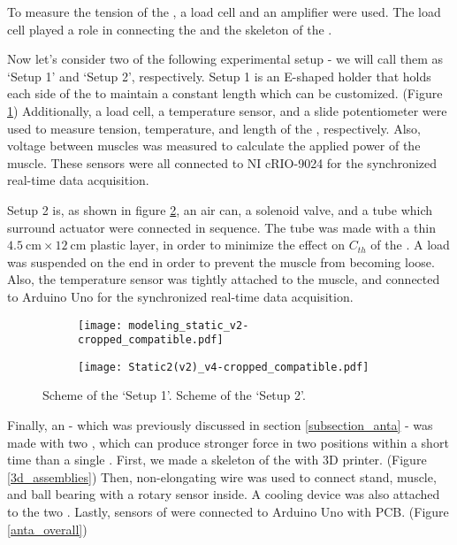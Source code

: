 To measure the tension of the \scpsnospace, a load cell and an amplifier were used.
The load cell played a role in connecting the \scps and the skeleton of the \antanospace.


Now let's consider two of the following experimental setup - we will call them as `Setup 1' and `Setup 2', respectively. Setup 1 is 
%
an E-shaped holder that holds each side of the \scp to maintain a constant length which can be customized. (Figure \ref{static_sch}) Additionally, a load cell, a temperature sensor, and a slide potentiometer were used to measure tension, temperature, and length of the \scpnospace, respectively. Also, voltage between muscles was measured to calculate the applied power of the muscle. These sensors were all connected to NI cRIO-9024 for the synchronized real-time data acquisition.

Setup 2 is, 
%
as shown in figure \ref{dynamic_sch}, an air can, a solenoid valve, and a tube which surround actuator were connected in sequence. 
The tube was made with a thin $\SI{4.5}{\centi\meter} \times \SI{12}{\centi\meter}$ plastic layer, in order to minimize the effect on $C_{th}$ of the \scpnospace.
A load was suspended on the end in order to prevent the muscle from becoming loose. 
Also, the temperature sensor was tightly attached to the muscle, and connected to Arduino Uno for the synchronized real-time data acquisition.


\begin{figure}[t]
	\centering
	\begin{subfigure}[t]{0.22\textwidth}
		\centering\texttt{[image: modeling\_static\_v2-cropped\_compatible.pdf]}
		\caption{\label{static_sch}}
	\end{subfigure}
	\begin{subfigure}[t]{0.22\textwidth}
		\centering\texttt{[image: Static2(v2)\_v4-cropped\_compatible.pdf]}
		\caption{\label{dynamic_sch}}
	\end{subfigure}
	\caption[Scheme of two experimental setups]{ Scheme of the `Setup 1'.  Scheme of the `Setup 2'.}
	\label{exp_sch}
\end{figure}



Finally, an \anta - which was previously discussed in section \ref{subsection_anta} - was made with two \scpsnospace, which can produce stronger force in two positions within a short time than a single \scpnospace.
First, we made a skeleton of the \anta with 3D printer. (Figure \ref{3d_assemblies}) Then, non-elongating wire was used to connect stand, muscle, and ball bearing with a rotary sensor inside. A cooling device was also attached to the two \scpsnospace. Lastly, sensors of \anta were connected to Arduino Uno with PCB. (Figure \ref{anta_overall})

